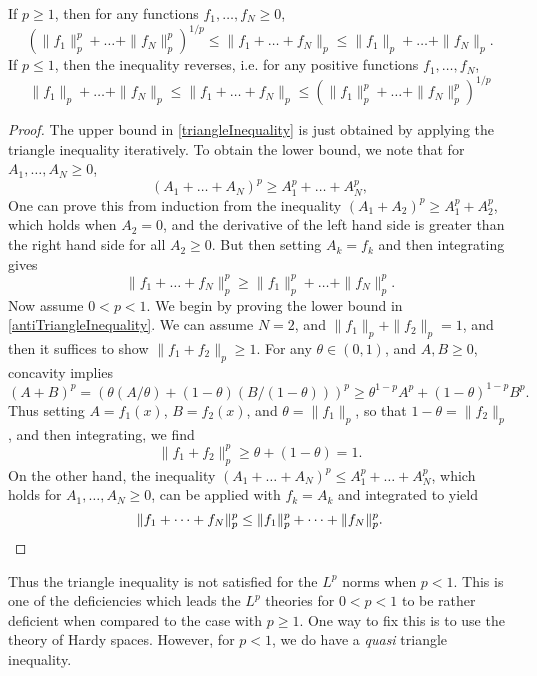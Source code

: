 \begin{theorem}
    If $p \geq 1$, then for any functions $f_1, \dots, f_N \geq 0$,
    \begin{equation} \label{triangleInequality} ( \| f_1 \|_p^p + \dots + \| f_N \|_p^p )^{1/p} \leq \| f_1 + \dots + f_N \|_p \leq \| f_1 \|_p + \dots + \| f_N \|_p. \end{equation}
    If $p \leq 1$, then the inequality reverses, i.e. for any positive functions $f_1, \dots, f_N$,
    \begin{equation} \label{antiTriangleInequality} \| f_1 \|_p + \dots + \| f_N \|_p \leq \| f_1 + \dots + f_N \|_p \leq (\| f_1 \|_p^p + \dots + \| f_N \|_p^p)^{1/p} \end{equation}
\end{theorem}
\begin{proof}
    The upper bound in \eqref{triangleInequality} is just obtained by applying the triangle inequality iteratively. To obtain the lower bound, we note that for $A_1, \dots, A_N \geq 0$,
    \[ (A_1 + \dots + A_N)^p \geq A_1^p + \dots + A_N^p, \]
    One can prove this from induction from the inequality $(A_1 + A_2)^p \geq A_1^p + A_2^p$, which holds when $A_2 = 0$, and the derivative of the left hand side is greater than the right hand side for all $A_2 \geq 0$. But then setting $A_k = f_k$ and then integrating gives
    \[ \| f_1 + \dots + f_N \|_p^p \geq \| f_1 \|_p^p + \dots + \| f_N \|_p^p. \]
    Now assume $0 < p < 1$. We begin by proving the lower bound in \ref{antiTriangleInequality}. We can assume $N = 2$, and $\| f_1 \|_p + \| f_2 \|_p = 1$, and then it suffices to show $\| f_1 + f_2 \|_p \geq 1$. For any $\theta \in (0,1)$, and $A,B \geq 0$, concavity implies
    \[ (A + B)^p = (\theta (A/\theta) + (1 - \theta) (B/(1-\theta)))^p \geq \theta^{1-p} A^p + (1 - \theta)^{1-p} B^p. \]
    Thus setting $A = f_1(x)$, $B = f_2(x)$, and $\theta = \| f_1 \|_p$, so that $1 - \theta = \| f_2 \|_p$, and then integrating, we find
    \[ \| f_1 + f_2 \|_p^p \geq \theta + (1 - \theta) = 1. \]
    On the other hand, the inequality $(A_1 + \dots + A_N)^p \leq A_1^p + \dots + A_N^p$, which holds for $A_1, \dots, A_N \geq 0$, can be applied with $f_k = A_k$ and integrated to yield
    \[ \| f_1 + \dots + f_N \|_p^p \leq \| f_1 \|_p^p + \dots + \| f_N \|_p^p. \qedhere \]
\end{proof}

Thus the triangle inequality is not satisfied for the $L^p$ norms when $p < 1$. This is one of the deficiencies which leads the $L^p$ theories for $0 < p < 1$ to be rather deficient when compared to the case with $p \geq 1$. One way to fix this is to use the theory of Hardy spaces. However, for $p < 1$, we do have a \emph{quasi} triangle inequality.

